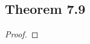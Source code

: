 \documentclass[../../main.tex]{subfiles}
\begin{document}
\subsection{Theorem 7.9}
\begin{wts}

\end{wts}
\begin{proof}

\end{proof}
\end{document}

